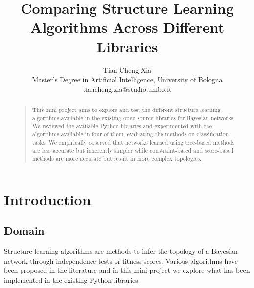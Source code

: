 \documentclass[letterpaper]{article}
\begin{document}
%
\title{Comparing Structure Learning Algorithms Across Different Libraries}
\author{Tian Cheng Xia\\
Master's Degree in Artificial Intelligence, University of Bologna\\
tiancheng.xia@studio.unibo.it
}
\maketitle



\begin{abstract}
\begin{quote}

This mini-project aims to explore and test the different structure learning algorithms available
in the existing open-source libraries for Bayesian networks.
We reviewed the available Python libraries and 
experimented with the algorithms available in four of them, evaluating the methods on classification tasks.
We empirically observed that networks learned using tree-based methods are less accurate but inherently simpler while
constraint-based and score-based methods are more accurate but result in more complex topologies.


\end{quote}
\end{abstract}


\section{Introduction}

\subsection{Domain}
Structure learning algorithms are methods to infer the topology of a Bayesian network through independence tests or fitness scores.
Various algorithms have been proposed in the literature and in this mini-project we explore what has been implemented in the existing Python libraries.
\end{document}
